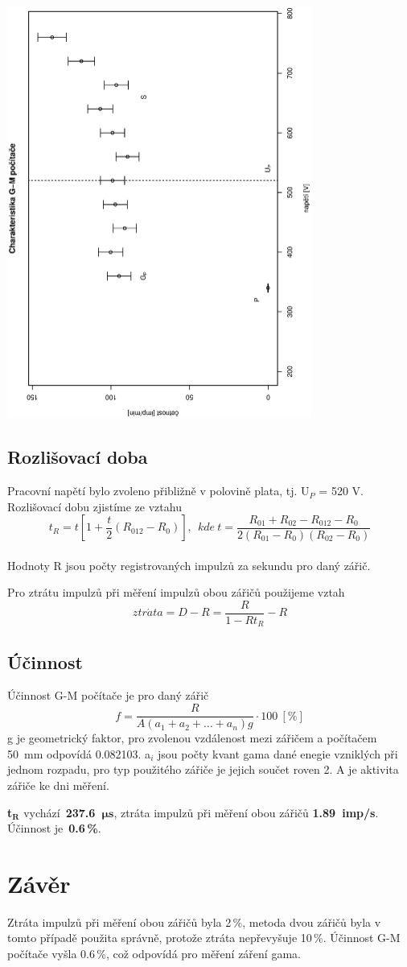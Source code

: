 \documentclass[11pt]{article}
\begin{document}
\begin{center}
\includegraphics[width=10cm,angle=270]{charakteristika.eps}
\end{center}

\subsection{Rozlišovací doba}
Pracovní napětí bylo zvoleno přibližně v polovině plata, tj. U$_P$ = 520 V.
Rozlišovací dobu zjistíme ze vztahu
$$
t_R = t \left[1 + \frac{t}{2} (R_{012} - R_0) \right],~~
kde~t = \frac{R_{01} + R_{02} - R_{012} - R_0}{2(R_{01} - R_0)(R_{02} - R_0)}
$$ \\
Hodnoty R jsou počty registrovaných impulzů za sekundu pro daný zářič.

Pro ztrátu impulzů při měření impulzů obou zářičů použijeme vztah
$$ ztr\acute{a}ta = D - R = \frac{R}{1 - Rt_R} - R$$

\clearpage
\subsection{Účinnost}
Účinnost G-M počítače je pro daný zářič
$$f = \frac{R}{A(a_1 + a_2 + \ldots + a_n)g} \cdot 100~[\%]$$
g je geometrický faktor, pro zvolenou vzdálenost mezi zářičem a počítačem 50~mm
odpovídá 0.082103. a$_i$ jsou počty kvant gama dané enegie vzniklých při jednom
rozpadu, pro typ použitého zářiče je jejich součet roven 2. A je aktivita
zářiče ke dni měření.

{\bf t$\mathbf{_R}$} vychází~{\bf 237.6~$\mathbf{\mu s}$}, ztráta impulzů při
měření obou zářičů {\bf 1.89~imp/s}.  Účinnost je~{\bf 0.6\,\%}.

\section{Závěr} 
Ztráta impulzů při měření obou zářičů byla 2\,\%, metoda dvou zářičů byla v
tomto případě použita správně, protože ztráta nepřevyšuje 10\,\%.  Účinnost G-M
počítače vyšla 0.6\,\%, což odpovídá pro měření záření gama.
\end{document}
